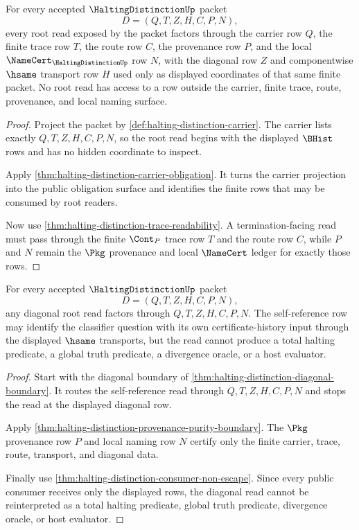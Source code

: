 \begin{theorem}
\label{thm:halting-distinction-root-unblock-carrier-route-exhaustion}
For every accepted $\HaltingDistinctionUp$ packet
$$
D=(Q,T,Z,H,C,P,N),
$$
every root read exposed by the packet factors through the carrier row $Q$, the finite trace row $T$, the route row $C$, the provenance row $P$, and the local $\NameCert_{\HaltingDistinctionUp}$ row $N$, with the diagonal row $Z$ and componentwise $\hsame$ transport row $H$ used only as displayed coordinates of that same finite packet. No root read has access to a row outside the carrier, finite trace, route, provenance, and local naming surface.
\end{theorem}
\begin{proof}
Project the packet by \autoref{def:halting-distinction-carrier}. The carrier lists exactly $Q,T,Z,H,C,P,N$, so the root read begins with the displayed $\BHist$ rows and has no hidden coordinate to inspect.

Apply \autoref{thm:halting-distinction-carrier-obligation}. It turns the carrier projection into the public obligation surface and identifies the finite rows that may be consumed by root readers.

Now use \autoref{thm:halting-distinction-trace-readability}. A termination-facing read must pass through the finite $\Cont_P$ trace row $T$ and the route row $C$, while $P$ and $N$ remain the $\Pkg$ provenance and local $\NameCert$ ledger for exactly those rows.
\end{proof}

\begin{theorem}
\label{thm:halting-distinction-root-unblock-diagonal-nonescape}
For every accepted $\HaltingDistinctionUp$ packet
$$
D=(Q,T,Z,H,C,P,N),
$$
any diagonal root read factors through $Q,T,Z,H,C,P,N$. The self-reference row may identify the classifier question with its own certificate-history input through the displayed $\hsame$ transports, but the read cannot produce a total halting predicate, a global truth predicate, a divergence oracle, or a host evaluator.
\end{theorem}
\begin{proof}
Start with the diagonal boundary of \autoref{thm:halting-distinction-diagonal-boundary}. It routes the self-reference read through $Q,T,Z,H,C,P,N$ and stops the read at the displayed diagonal row.

Apply \autoref{thm:halting-distinction-provenance-purity-boundary}. The $\Pkg$ provenance row $P$ and local naming row $N$ certify only the finite carrier, trace, route, transport, and diagonal data.

Finally use \autoref{thm:halting-distinction-consumer-non-escape}. Since every public consumer receives only the displayed rows, the diagonal read cannot be reinterpreted as a total halting predicate, global truth predicate, divergence oracle, or host evaluator.
\end{proof}

